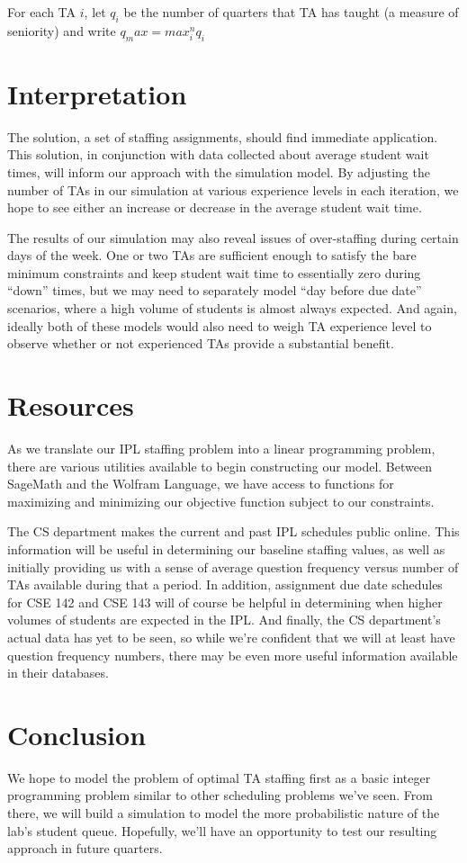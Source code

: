 \documentclass{article}
\begin{document}
\begin{multicols}{2}
For each TA $i$, let $q_i$ be the number of quarters that TA has taught (a measure of seniority) and write $q_max = max_i^n{q_i}$

\section*{Interpretation}
The solution, a set of staffing assignments, should find immediate application. This solution, in conjunction with data collected about average student wait times, will inform our approach with the simulation model. By adjusting the number of TAs in our simulation at various experience levels in each iteration, we hope to see either an increase or decrease in the average student wait time.

The results of our simulation may also reveal issues of over-staffing during certain days of the week. One or two TAs are sufficient enough to satisfy the bare minimum constraints and keep student wait time to essentially zero during “down” times, but we may need to separately model “day before due date” scenarios, where a high volume of students is almost always expected. And again, ideally both of these models would also need to weigh TA experience level to observe whether or not experienced TAs provide a substantial benefit.

\section*{Resources}
As we translate our IPL staffing problem into a linear programming problem, there are various utilities available to begin constructing our model. Between SageMath and the Wolfram Language, we have access to functions for maximizing and minimizing our objective function subject to our constraints.

The CS department makes the current and past IPL schedules public online. This information will be useful in determining our baseline staffing values, as well as initially providing us with a sense of average question frequency versus number of TAs available during that a period. In addition, assignment due date schedules for CSE 142 and CSE 143 will of course be helpful in determining when higher volumes of students are expected in the IPL. And finally, the CS department’s actual data has yet to be seen, so while we’re confident that we will at least have question frequency numbers, there may be even more useful information available in their databases.

\section*{Conclusion}
We hope to model the problem of optimal TA staffing first as a basic integer programming problem similar to other scheduling problems we've seen. From there, we will build a simulation to model the more probabilistic nature of the lab’s student queue. Hopefully, we'll have an opportunity to test our resulting approach in future quarters.

\end{multicols}
\end{document}
